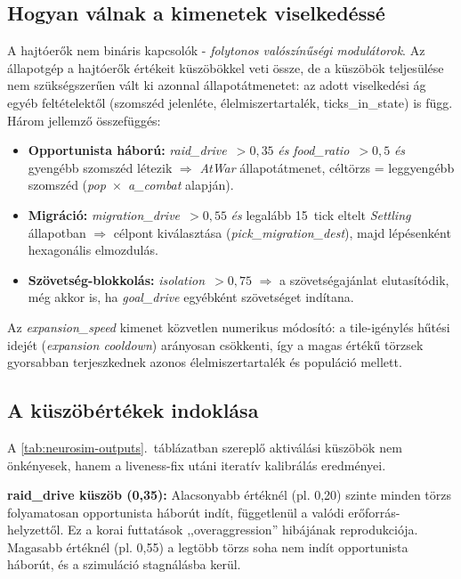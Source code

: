 \subsection*{Hogyan válnak a kimenetek viselkedéssé}

A hajtóerők nem bináris kapcsolók - \textit{folytonos valószínűségi modulátorok}.
Az állapotgép a hajtóerők értékeit küszöbökkel veti össze, de a küszöbök teljesülése
nem szükségszerűen vált ki azonnal állapotátmenetet: az adott viselkedési ág
egyéb feltételektől (szomszéd jelenléte, élelmiszertartalék, ticks\_in\_state)
is függ. Három jellemző összefüggés:

\begin{itemize}
  \item \textbf{Opportunista háború:} \textit{raid\_drive}~$> 0{,}35$ \textit{és}
    \textit{food\_ratio}~$> 0{,}5$ \textit{és} gyengébb szomszéd létezik
    $\Rightarrow$ \textit{AtWar} állapotátmenet, céltörzs = leggyengébb
    szomszéd (\textit{pop~$\times$~a\_combat} alapján).
  \item \textbf{Migráció:} \textit{migration\_drive}~$> 0{,}55$ \textit{és}
    legalább 15~tick eltelt \textit{Settling} állapotban
    $\Rightarrow$ célpont kiválasztása (\textit{pick\_migration\_dest}),
    majd lépésenként hexagonális elmozdulás.
  \item \textbf{Szövetség-blokkolás:} \textit{isolation}~$> 0{,}75$
    $\Rightarrow$ a szövetségajánlat elutasítódik, még akkor is, ha
    \textit{goal\_drive} egyébként szövetséget indítana.
\end{itemize}

Az \textit{expansion\_speed} kimenet közvetlen numerikus módosító: a tile-igénylés
hűtési idejét (\textit{expansion cooldown}) arányosan csökkenti, így a magas értékű
törzsek gyorsabban terjeszkednek azonos élelmiszertartalék és populáció mellett.

\subsection*{A küszöbértékek indoklása}

A \ref{tab:neurosim-outputs}.~táblázatban szereplő aktiválási küszöbök nem önkényesek, hanem
a liveness-fix utáni iteratív kalibrálás eredményei.

\textbf{raid\_drive küszöb (0{,}35):} Alacsonyabb értéknél (pl. 0{,}20) szinte
minden törzs folyamatosan opportunista háborút indít, függetlenül a valódi
erőforrás-helyzettől. Ez a korai futtatások ,,overaggression'' hibájának
reprodukciója. Magasabb értéknél (pl. 0{,}55) a legtöbb törzs soha nem indít
opportunista háborút, és a szimuláció stagnálásba kerül.

